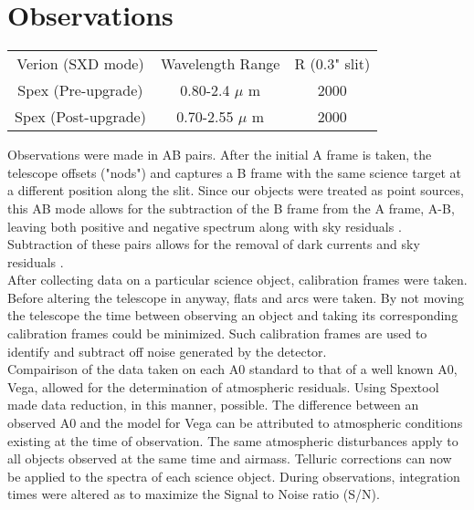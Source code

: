 \section{Observations}

\begin{table}
\begin{tabular}{ccc}
Verion (SXD mode) & Wavelength Range & R (0.3" slit) \\
Spex (Pre-upgrade) & 0.80-2.4 $\mu$ m & 2000 \\
Spex (Post-upgrade) & 0.70-2.55 $\mu$ m & 2000 \\
\end{tabular}
\end{table}




Observations were made in AB pairs.  After the initial A frame is taken, the telescope offsets ("nods") and captures a B frame with the same science target at a different position along the slit.  Since our objects were treated as point sources, this AB mode allows for the subtraction of the B frame from the A frame, A-B, leaving both positive and negative spectrum along with sky residuals \cite{Cushing_2004}. Subtraction of these pairs allows for the removal of dark currents and sky residuals \cite{Joyce_1992}.\\


After collecting data on a particular science object, calibration frames were taken.  Before altering the telescope in anyway, flats and arcs were taken.  By not moving the telescope the time between observing an object and taking its corresponding calibration frames could be minimized.  Such calibration frames are used to identify and subtract off noise generated by the detector.\\



Compairison of the data taken on each A0 standard to that of a well known A0, Vega, allowed for the determination of atmospheric residuals.  Using Spextool made data reduction, in this manner, possible.  The difference between an observed A0 and the model for Vega can be attributed to atmospheric conditions existing at the time of observation.  The same atmospheric disturbances apply to all objects observed at the same time and airmass.  Telluric corrections can now be applied to the spectra of each science object.  During observations, integration times were altered as to maximize the Signal to Noise ratio (S/N). \cite{Cushing_2004}\\


